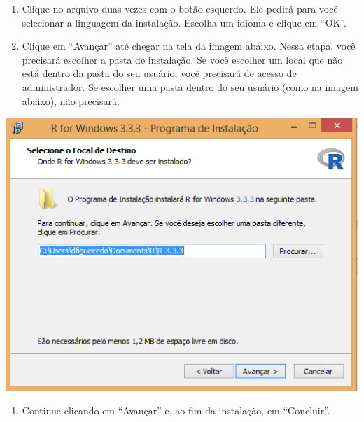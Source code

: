 \documentclass[
]{book}
\providecommand{\tightlist}{%
  \setlength{\itemsep}{0pt}\setlength{\parskip}{0pt}}
\begin{document}
\begin{enumerate}
\def\labelenumi{\arabic{enumi}.}
\setcounter{enumi}{2}
\item
  Clique no arquivo duas vezes com o botão esquerdo. Ele pedirá para você selecionar a linguagem da instalação. Escolha um idioma e clique em ``OK''.
\item
  Clique em ``Avançar'' até chegar na tela da imagem abaixo. Nessa etapa, você precisará escolher a pasta de instalação. Se você escolher um local que não está dentro da pasta do seu usuário, você precisará de acesso de administrador. Se escolher uma pasta dentro do seu usuário (como na imagem abaixo), não precisará.
\end{enumerate}

\begin{center}\includegraphics[width=7.14in]{img/instalacao/06-r-pasta} \end{center}

\begin{enumerate}
\def\labelenumi{\arabic{enumi}.}
\setcounter{enumi}{4}
\tightlist
\item
  Continue clicando em ``Avançar'' e, ao fim da instalação, em ``Concluir''.
\end{enumerate}
\end{document}
